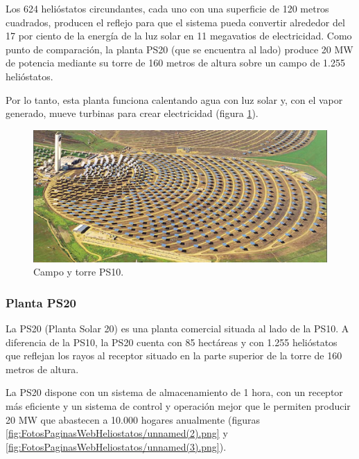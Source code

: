 Los 624 helióstatos circundantes, cada uno con una superficie de 120 metros cuadrados, producen el reflejo para que el sistema pueda convertir alrededor del 17 por ciento de la energía de la luz solar en 11 megavatios de electricidad. Como punto de comparación, la planta PS20 (que se encuentra al lado) produce 20 MW de potencia mediante su torre de 160 metros de altura sobre un campo de 1.255 helióstatos.

Por lo tanto, esta planta funciona calentando agua con luz solar y, con el vapor generado, mueve turbinas para crear electricidad (figura \ref{fig:FotosPaginasWebHeliostatos/unnamed(6).jpg}).

\begin{figure}[h!]
  	\centering
	\includegraphics[width=\textwidth]{FotosPaginasWebHeliostatos/unnamed(6).jpg}
	\caption{Campo y torre PS10.
	\label{fig:FotosPaginasWebHeliostatos/unnamed(6).jpg}}
\end{figure}

\cite{JonathanWebSite}



\subsubsection{Planta PS20}

La PS20 (Planta Solar 20) es una planta comercial situada al lado de la PS10.
A diferencia de la PS10, la PS20 cuenta con 85 hectáreas y con 1.255 helióstatos que reflejan los rayos al receptor situado en la parte superior de la torre de 160 metros de altura.

La PS20 dispone con un sistema de almacenamiento de 1 hora, con un receptor más eficiente y un sistema de control y operación mejor que le permiten producir 20 MW que abastecen a 10.000 hogares anualmente (figuras \ref{fig:FotosPaginasWebHeliostatos/unnamed(2).png} y \ref{fig:FotosPaginasWebHeliostatos/unnamed(3).png}).

